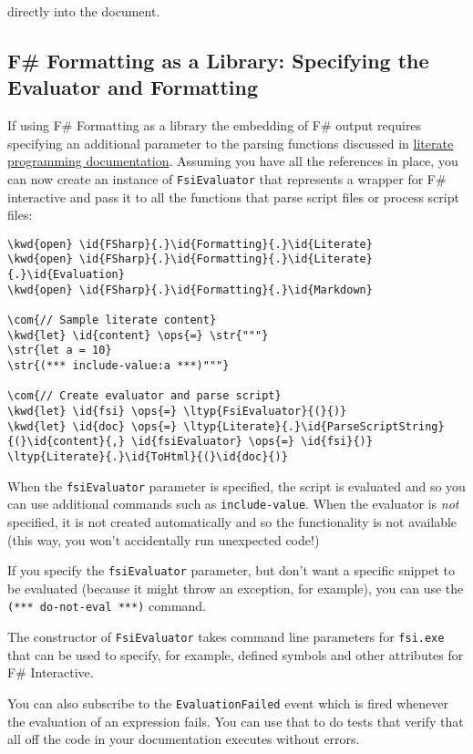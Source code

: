 \documentclass{article}
\newcommand{\id}[1]{\textcolor{black}{#1}}
\newcommand{\com}[1]{\textcolor{officegreen}{#1}}
\newcommand{\kwd}[1]{\textcolor{navy}{#1}}
\newcommand{\ops}[1]{\textcolor{purple}{#1}}
\newcommand{\str}[1]{\textcolor{olive}{#1}}
\begin{document}
directly into the document.
\subsection*{F\# Formatting as a Library:  Specifying the Evaluator and Formatting}



If using F\# Formatting as a library the embedding of F\# output requires specifying an additional parameter to the
parsing functions discussed in \href{literate.html}{literate programming documentation}.
Assuming you have all the references in place, you can now create an instance of
\texttt{FsiEvaluator} that represents a wrapper for F\# interactive and pass it to all the
functions that parse script files or process script files:
\begin{Verbatim}[commandchars=\\\{\}]
\kwd{open} \id{FSharp}{.}\id{Formatting}{.}\id{Literate}
\kwd{open} \id{FSharp}{.}\id{Formatting}{.}\id{Literate}{.}\id{Evaluation}
\kwd{open} \id{FSharp}{.}\id{Formatting}{.}\id{Markdown}

\com{// Sample literate content}
\kwd{let} \id{content} \ops{=} \str{"""}
\str{let a = 10}
\str{(*** include-value:a ***)"""}

\com{// Create evaluator and parse script}
\kwd{let} \id{fsi} \ops{=} \ltyp{FsiEvaluator}{(}{)}
\kwd{let} \id{doc} \ops{=} \ltyp{Literate}{.}\id{ParseScriptString}{(}\id{content}{,} \id{fsiEvaluator} \ops{=} \id{fsi}{)}
\ltyp{Literate}{.}\id{ToHtml}{(}\id{doc}{)}
\end{Verbatim}



When the \texttt{fsiEvaluator} parameter is specified, the script is evaluated and so you
can use additional commands such as \texttt{include-value}. When the evaluator is \emph{not} specified,
it is not created automatically and so the functionality is not available (this way,
you won't accidentally run unexpected code!)


If you specify the \texttt{fsiEvaluator} parameter, but don't want a specific snippet to be evaluated
(because it might throw an exception, for example), you can use the \texttt{(*** do-not-eval ***)}
command.


The constructor of \texttt{FsiEvaluator} takes command line parameters for \texttt{fsi.exe} that can
be used to specify, for example, defined symbols and other attributes for F\# Interactive.


You can also subscribe to the \texttt{EvaluationFailed} event which is fired whenever the evaluation
of an expression fails. You can use that to do tests that verify that all off the code in your
documentation executes without errors.
\end{document}

